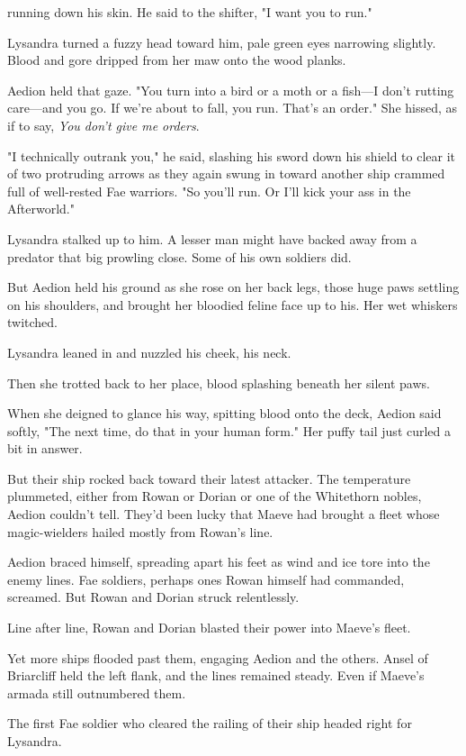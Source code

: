 running down his skin. He said to the shifter, "I want you to run."

Lysandra turned a fuzzy head toward him, pale green eyes narrowing slightly. Blood and gore dripped from her maw onto the wood planks.

Aedion held that gaze. "You turn into a bird or a moth or a fish---I don't rutting care---and you go. If we're about to fall, you run. That's an order." She hissed, as if to say, \emph{You don't give me orders}.

"I technically outrank you," he said, slashing his sword down his shield to clear it of two protruding arrows as they again swung in toward another ship crammed full of well-rested Fae warriors. "So you'll run. Or I'll kick your ass in the Afterworld."

Lysandra stalked up to him. A lesser man might have backed away from a predator that big prowling close. Some of his own soldiers did.

But Aedion held his ground as she rose on her back legs, those huge paws settling on his shoulders, and brought her bloodied feline face up to his. Her wet whiskers twitched.

Lysandra leaned in and nuzzled his cheek, his neck.

Then she trotted back to her place, blood splashing beneath her silent paws.

When she deigned to glance his way, spitting blood onto the deck, Aedion said softly, "The next time, do that in your human form." Her puffy tail just curled a bit in answer.

But their ship rocked back toward their latest attacker. The temperature plummeted, either from Rowan or Dorian or one of the Whitethorn nobles, Aedion couldn't tell. They'd been lucky that Maeve had brought a fleet whose magic-wielders hailed mostly from Rowan's line.

Aedion braced himself, spreading apart his feet as wind and ice tore into the enemy lines. Fae soldiers, perhaps ones Rowan himself had commanded, screamed. But Rowan and Dorian struck relentlessly.

Line after line, Rowan and Dorian blasted their power into Maeve's fleet.

Yet more ships flooded past them, engaging Aedion and the others. Ansel of Briarcliff held the left flank, and  the lines remained steady. Even if Maeve's armada still outnumbered them.

The first Fae soldier who cleared the railing of their ship headed right for Lysandra.

